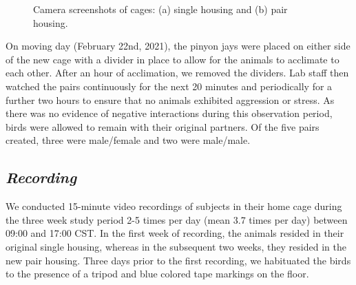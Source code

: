 \documentclass[
  pub]{apa6}
\begin{document}
\begin{figure}

{\centering {}\newline{}\newline

}

\caption{Camera screenshots of cages: (a) single housing and (b) pair housing.}\label{fig:cage-fig}
\end{figure}

On moving day (February 22nd, 2021), the pinyon jays were placed on either side of the new cage with a divider in place to allow for the animals to acclimate to each other. After an hour of acclimation, we removed the dividers. Lab staff then watched the pairs continuously for the next 20 minutes and periodically for a further two hours to ensure that no animals exhibited aggression or stress. As there was no evidence of negative interactions during this observation period, birds were allowed to remain with their original partners. Of the five pairs created, three were male/female and two were male/male.

\hypertarget{recording}{%
\subsection{\texorpdfstring{\emph{Recording}}{Recording}}\label{recording}}

We conducted 15-minute video recordings of subjects in their home cage during the three week study period 2-5 times per day (mean 3.7 times per day) between 09:00 and 17:00 CST. In the first week of recording, the animals resided in their original single housing, whereas in the subsequent two weeks, they resided in the new pair housing. Three days prior to the first recording, we habituated the birds to the presence of a tripod and blue colored tape markings on the floor.
\end{document}
